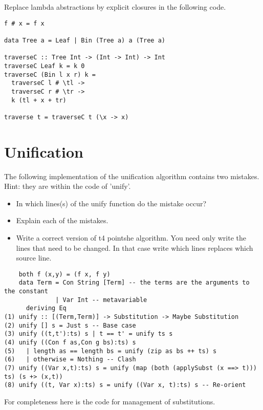 \documentclass{article}
\newcommand{\answer}[1]{}
\begin{document}
Replace lambda abstractions by explicit closures in the following
code.
\begin{verbatim}
f # x = f x

data Tree a = Leaf | Bin (Tree a) a (Tree a)

traverseC :: Tree Int -> (Int -> Int) -> Int
traverseC Leaf k = k 0
traverseC (Bin l x r) k =
  traverseC l # \tl ->
  traverseC r # \tr ->
  k (tl + x + tr)

traverse t = traverseC t (\x -> x)
\end{verbatim}

\answer{
  \begin{verbatim}
  \end{verbatim}
}
\section{Unification}

The following implementation of the unification algorithm contains two mistakes. Hint: they are within the code of 'unify'.
\begin{itemize}
\item In which lines(s) of the unify function do the mistake occur?
\item Explain each of the mistakes. 
\item Write a correct version of t4 pointshe algorithm. You need only write
  the lines that need to be changed. In that case write which lines
  replaces which source line. 
\end{itemize}



\begin{verbatim}
    both f (x,y) = (f x, f y)
    data Term = Con String [Term] -- the terms are the arguments to the constant
              | Var Int -- metavariable
      deriving Eq
(1) unify :: [(Term,Term)] -> Substitution -> Maybe Substitution
(2) unify [] s = Just s -- Base case
(3) unify ((t,t'):ts) s | t == t' = unify ts s
(4) unify ((Con f as,Con g bs):ts) s
(5)   | length as == length bs = unify (zip as bs ++ ts) s
(6)   | otherwise = Nothing -- Clash
(7) unify ((Var x,t):ts) s = unify (map (both (applySubst (x ==> t))) ts) (s +> (x,t))
(8) unify ((t, Var x):ts) s = unify ((Var x, t):ts) s -- Re-orient
\end{verbatim}


For completeness here is the code for management of substitutions.
\end{document}
